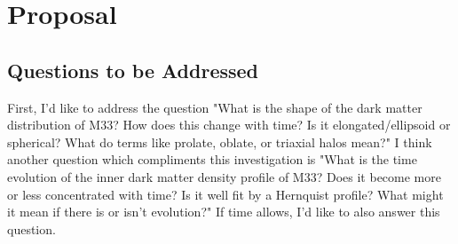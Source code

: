 \documentclass[fleqn,usenatbib]{mnras}
\begin{document}
\section{Proposal}
\subsection{Questions to be Addressed}
First, I'd like to address the question "What is the shape of the dark matter distribution of M33? How does this change with time? Is it elongated/ellipsoid or spherical? What do terms like prolate, oblate, or triaxial halos mean?" I think another question which compliments this investigation is "What is the time evolution of the inner dark matter density profile of M33? Does it become more or less concentrated with time? Is it well fit by a Hernquist profile? What might it mean if there is or isn’t evolution?" If time allows, I'd like to also answer this question.
\end{document}
